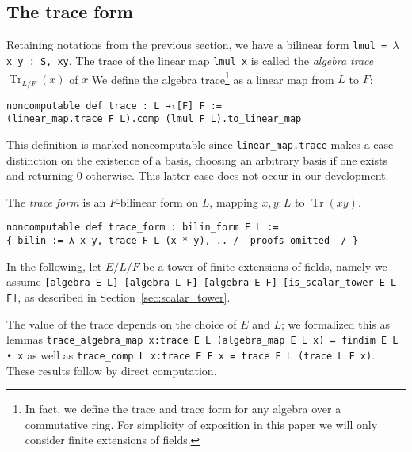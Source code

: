 \documentclass[a4paper,USenglish,cleveref, autoref, thm-restate]{lipics-v2021}
\newcommand{\lean}[1]{\texttt{#1}\xspace} %
\DeclareMathOperator{\Tr}{Tr}
\begin{document}
\subsection{The trace form}\label{sec:trace-form}
Retaining notations from the previous section, we have a bilinear form \lean{lmul = $\lambda$ x y : S, xy}.
The trace of the linear map \lean{lmul x} is called the \emph{algebra trace} $\Tr_{L / F}(x)$ of $x$
We define the algebra trace\footnote{In fact, we define the trace and trace form for any algebra over a commutative ring.
For simplicity of exposition in this paper we will only consider finite extensions of fields.} as a linear map from $L$ to $F$:
\begin{lstlisting}
noncomputable def trace : L →ₗ[F] F :=
(linear_map.trace F L).comp (lmul F L).to_linear_map
\end{lstlisting}
This definition is marked noncomputable since \lean{linear\_map.trace} makes a case distinction on the existence of a basis,
choosing an arbitrary basis if one exists and returning $0$ otherwise.
This latter case does not occur in our development.

The \emph{trace form} is an $F$-bilinear form on $L$, mapping $x, y : L$ to $\Tr(xy)$.
\begin{lstlisting}
noncomputable def trace_form : bilin_form F L :=
{ bilin := λ x y, trace F L (x * y), .. /- proofs omitted -/ }
\end{lstlisting}

In the following, let $E / L / F$ be a tower of finite extensions of fields, namely we assume \lean{[algebra E L] [algebra L F] [algebra E F] [is\_scalar\_tower E L F]}, as described in Section~\ref{sec:scalar_tower}.

The value of the trace depends on the choice of $E$ and $L$; we formalized this as lemmas \lean{trace\_algebra\_map x:trace E L (algebra\_map E L x) = findim E L • x} as well as \lean{trace\_comp L x:trace E F x = trace E L (trace L F x)}.
These results follow by direct computation.
\end{document}
